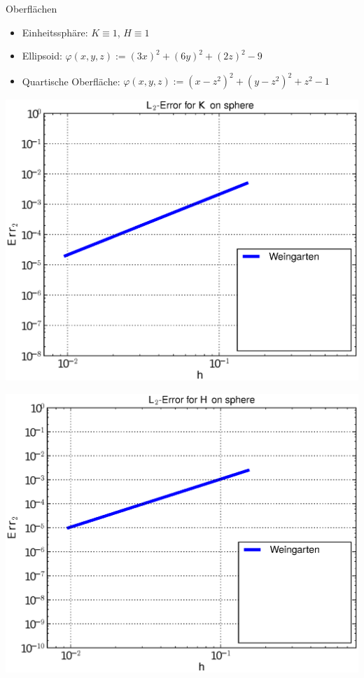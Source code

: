 \documentclass{beamer}
\begin{document}
  \begin{frame}
    \begin{block}{Oberflächen}
      \begin{itemize}
        \item<1-> Einheitssphäre: \( K\equiv 1 \), \( H\equiv 1 \)
        \item<8-> Ellipsoid: \(  \varphi(x,y,z) := (3x)^{2} + (6y)^{2} + (2z)^{2} - 9  \)
        \item<16-> Quartische Oberfläche: \( \varphi(x,y,z) :=  (x-z^{2})^{2} + (y-z^{2})^{2} + z^{2} - 1  \)
      \end{itemize}
    \end{block}
    \vfill
    \begin{overprint}
          \begin{minipage}[t]{0.49\textwidth}
            \centering\includegraphics[width=\textwidth]{bilder/Curvature/sphere/ErrKL2_1.eps}
          \end{minipage}\hfill
          \begin{minipage}[t]{0.49\textwidth}
            \centering\includegraphics[width=\textwidth]{bilder/Curvature/sphere/ErrHL2_1.eps}

\end{minipage}
\end{overprint}
\end{frame}
\end{document}
